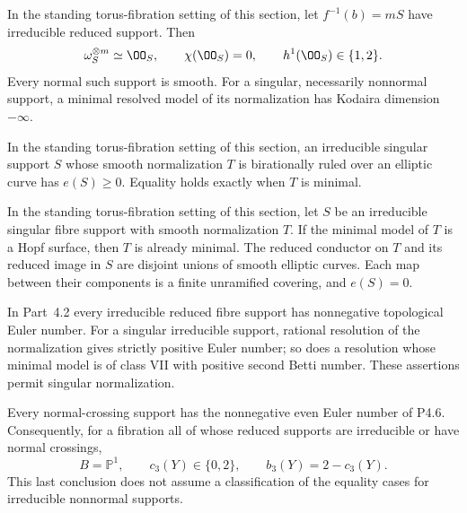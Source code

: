 
\begin{proposition}[P4.12]\hypertarget{tag-02WJ}{}\label{night:P4.12}\label{stmt:P4.12}


In the standing torus-fibration setting of this section, let $f^{-1}(b)=mS$
have irreducible reduced support. Then
\[
 \omega_S^{\otimes m}\simeq\OO_S,\qquad
 \chi(\OO_S)=0,\qquad h^1(\OO_S)\in\{1,2\}.
\]
Every normal such support is smooth. For a singular, necessarily
nonnormal support, a minimal resolved model of its normalization
has Kodaira dimension $-\infty$.
\end{proposition}

\begin{proposition}[P4.22]\hypertarget{tag-02WU}{}\label{night:P4.22}\label{stmt:P4.22}


In the standing torus-fibration setting of this section, an irreducible singular support
$S$ whose smooth normalization $T$ is birationally ruled
over an elliptic curve has $e(S)\ge0$. Equality holds
exactly when $T$ is minimal.
\end{proposition}

\begin{proposition}[P4.24]\hypertarget{tag-02WW}{}\label{night:P4.24}\label{stmt:P4.24}


In the standing torus-fibration setting of this section, let $S$ be an irreducible
singular fibre support with smooth normalization $T$.
If the minimal model of $T$ is a Hopf surface, then
$T$ is already minimal. The reduced conductor on $T$
and its reduced image in $S$ are disjoint unions of
smooth elliptic curves. Each map between their
components is a finite unramified covering, and
$e(S)=0$.
\end{proposition}

\begin{proposition}[P4.26]\hypertarget{tag-02WY}{}\label{night:P4.26}\label{stmt:P4.26}


In Part~4.2 every irreducible reduced fibre support
has nonnegative topological Euler number. For a
singular irreducible support, rational resolution
of the normalization gives strictly positive
Euler number; so does a resolution whose minimal
model is of class VII with positive second
Betti number. These assertions permit singular
normalization.

Every normal-crossing support has the
nonnegative even Euler number of P4.6.
Consequently, for a fibration all of whose
reduced supports are irreducible or have
normal crossings,
\[
 B=\mathbb P^1,\qquad c_3(Y)\in\{0,2\},
 \qquad b_3(Y)=2-c_3(Y).
\]
This last conclusion does not assume a
classification of the equality cases for
irreducible nonnormal supports.
\end{proposition}

